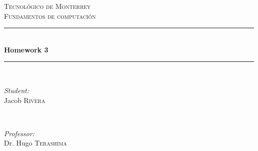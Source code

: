 \documentclass{article}
\begin{document}
\begin{titlepage}

    \newcommand{\HRule}{\rule{\linewidth}{0.5mm}} %

    \center %


    \textsc{\LARGE Tecnológico de Monterrey}\\[1.5cm] %
    \textsc{\Large Fundamentos de computación}\\[0.5cm] %


    \HRule \\[0.4cm]
    { \huge \bfseries Homework 3}\\[0.4cm] %
    \HRule \\[1.5cm]


    \begin{minipage}{0.4\textwidth}
    \begin{flushleft} \large
    \emph{Student:}\\
    Jacob \textsc{Rivera} %
    \end{flushleft}
    \end{minipage}
    ~
    \begin{minipage}{0.4\textwidth}
    \begin{flushright} \large
    \emph{Professor:} \\
    Dr. Hugo \textsc{Terashima} %
    \end{flushright}
    \end{minipage}\\[2cm]


\end{titlepage}
\end{document}
